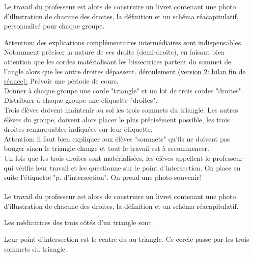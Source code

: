 \begin{activite}
\begin{itemize}
Le travail du professeur est alors de construire un livret contenant une photo d'illustration de chacune des droites, la définition et un schéma réacapitulatif, personnalisé pour chaque groupe.
\end{itemize}
Attention: des explications complémentaires intermédiaires sont indispensables. Notamment préciser la nature de ces droite (demi-droite), en faisant bien attention que les cordes matérialisant les bissectrices partent du sommet de l'angle alors que les autre droites dépassent.
\underline{déroulement (version 2: bilan fin de séance):} Prévoir une période de cours.\\
Donner à chaque groupe une corde "triangle" et un lot de trois cordes  "droites".\\
Distribuer à chaque groupe une étiquette "droites".\\
Trois élèves doivent maintenir au sol les trois sommets du triangle. Les autres élèves du groupe, doivent alors placer le plus précisément possible, les trois droites remarquables indiquées sur leur étiquette.\\
Attention: il faut bien expliquer aux élèves "sommets" qu'ils ne doivent pas bouger sinon le triangle change et tout le travail est à recommencer.\\
Un fois que les trois droites sont matérialisées, les élèves appellent le professeur qui vérifie leur travail et les questionne sur le point d'intersection. On place en suite l'étiquette "p. d'intersection". On prend une photo souvenir!\\\\
Le travail du professeur est alors de construire un livret contenant une photo d'illustration de chacune des droites, la définition et un schéma réacapitulatif.


\end{activite}



\newpage


 \begin{aconnaitre}
Les médiatrices des trois côtés d'un triangle sont .

Leur point d'intersection est le centre du  au triangle. Ce cercle passe par les trois sommets du triangle.
\end{aconnaitre}

 \vspace{2em}
 
